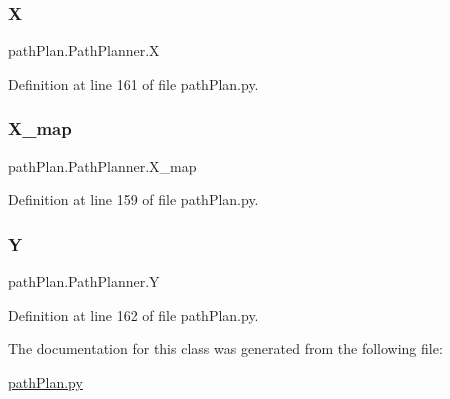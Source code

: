 \subsubsection{\texorpdfstring{X}{X}}
{\footnotesize\ttfamily path\+Plan.\+Path\+Planner.\+X}



Definition at line 161 of file path\+Plan.\+py.

\mbox{\label{classpath_plan_1_1_path_planner_a726f4b4f55f7fb557eabceb962e25871}} 
\subsubsection{\texorpdfstring{X\+\_\+map}{X\_map}}
{\footnotesize\ttfamily path\+Plan.\+Path\+Planner.\+X\+\_\+map}



Definition at line 159 of file path\+Plan.\+py.

\mbox{\label{classpath_plan_1_1_path_planner_a4e78ffd0fb9df91a15d01ca5cb615d24}} 
\subsubsection{\texorpdfstring{Y}{Y}}
{\footnotesize\ttfamily path\+Plan.\+Path\+Planner.\+Y}



Definition at line 162 of file path\+Plan.\+py.



The documentation for this class was generated from the following file\+:\begin{DoxyCompactItemize}
\item 
\mbox{\hyperlink{path_plan_8py}{path\+Plan.\+py}}\end{DoxyCompactItemize}
